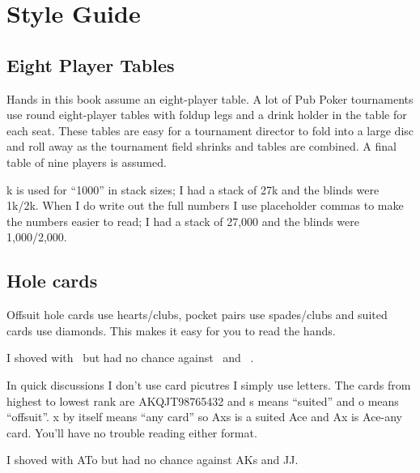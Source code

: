 \chapter{Style Guide}


\section*{Eight Player Tables}

Hands in this book assume an eight-player table. A lot of Pub
Poker tournaments use round eight-player tables with foldup legs and a
drink holder in the table for each seat. These tables are easy for a
tournament director to fold into a large disc and roll away as the
tournament field shrinks and tables are combined. A final table of
nine players is assumed.

k is used for ``1000'' in stack sizes; I had a stack of 27k and the
blinds were 1k/2k. When I do write out the full numbers I use
placeholder commas to make the numbers easier to read; I had a stack
of 27,000 and the blinds were 1,000/2,000.

\section*{Hole cards}

Offsuit hole cards use hearts/clubs, pocket pairs use spades/clubs and
suited cards use diamonds. This makes it easy for you to read the hands.

I shoved with \Ah\tenc\ but had no chance against \Ad\Kd\ and \Js\Jc\ .

In quick discussions I don't use card picutres I simply use
letters. The cards from highest to lowest rank are AKQJT98765432 and s
means ``suited'' and o means ``offsuit''. x by itself means ``any
card'' so Axs is a suited Ace and Ax is Ace-any card. You'll have no
trouble reading either format.

I shoved with ATo but had no chance against AKs and JJ.



